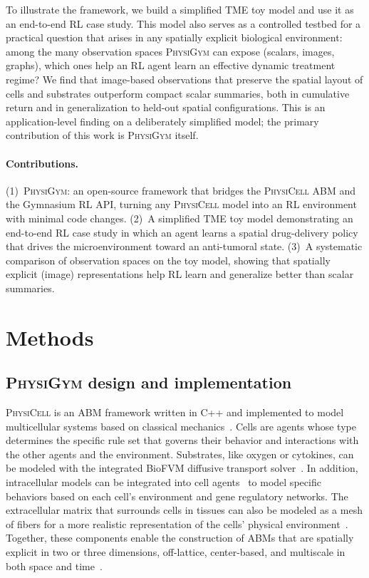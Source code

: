 \documentclass{article}
\newcommand{\physigym}{\textsc{PhysiGym}}
\newcommand{\physicell}{\textsc{PhysiCell}}
\begin{document}
To illustrate the framework, we build a simplified TME toy model and use it as
an end-to-end RL case study. This model also serves as a controlled testbed for
a practical question that arises in any spatially explicit biological
environment: among the many observation spaces \physigym{} can expose (scalars,
images, graphs), which ones help an RL agent learn an effective dynamic treatment
regime? We find that image-based observations that preserve the spatial layout of
cells and substrates outperform compact scalar summaries, both in cumulative
return and in generalization to held-out spatial configurations. This is an
application-level finding on a deliberately simplified model; the primary
contribution of this work is \physigym{} itself.

\paragraph{Contributions.}
(1)~\physigym{}: an open-source framework that bridges the \physicell{} ABM and
the Gymnasium RL API, turning any \physicell{} model into an RL environment with
minimal code changes.
(2)~A simplified TME toy model demonstrating an end-to-end RL case study in
which an agent learns a spatial drug-delivery policy that drives the
microenvironment toward an anti-tumoral state.
(3)~A systematic comparison of observation spaces on the toy model, showing
that spatially explicit (image) representations help RL learn and generalize
better than scalar summaries.

\section{Methods}
\subsection{\physigym{} design and implementation}
\label{sec:physigym}

\physicell{} is an ABM framework written in C++ and implemented to model
multicellular systems based on classical
mechanics~\citep{ghaffarizadeh2018physicell}. Cells are agents whose type
determines the specific rule set that governs their behavior and interactions
with the other agents and the environment. Substrates, like oxygen or cytokines,
can be modeled with the integrated BioFVM diffusive transport
solver~\citep{ghaffarizadeh2016biofvm}. In addition, intracellular models can be
integrated into cell agents~\citep{letort2018physiboss, ponce2023physiboss,
ruscone2024physiboss} to model specific behaviors based on each cell's
environment and gene regulatory networks. The extracellular matrix that
surrounds cells in tissues can also be modeled as a mesh of fibers for a more
realistic representation of the cells' physical environment~\citep{noel2024physimess}.
Together, these components enable the construction of ABMs that are spatially
explicit in two or three dimensions, off-lattice, center-based, and multiscale
in both space and time~\citep{metzcar2019review}.
\end{document}
